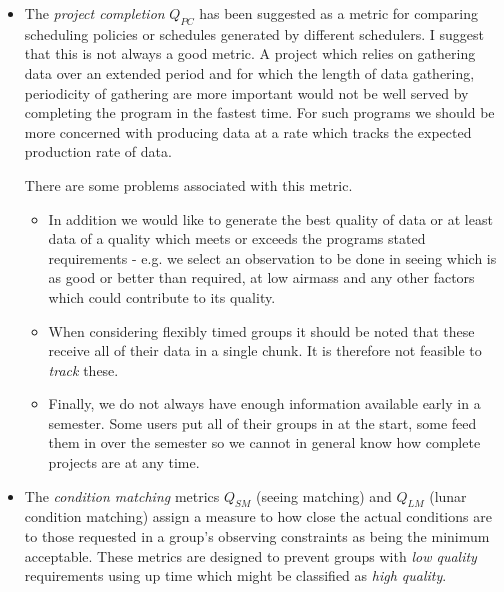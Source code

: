 \begin{itemize}
\item The \emph{project completion} $Q_{PC}$ has been suggested as a metric for comparing scheduling policies or schedules generated by different schedulers. I suggest that this is not always a good metric. A project which relies on gathering data over an extended period and for which the length of data gathering, periodicity of gathering are more important would not be well served by completing the program in the fastest time. For such programs we should be more concerned with producing data at a rate which tracks the expected production rate of data. 

There are some problems associated with this metric.
\begin{itemize}
\item In addition we would like to generate the best quality of data or at least data of a quality which meets or exceeds the programs stated requirements - e.g. we select an observation to be done in seeing which is as good or better than required, at low airmass and any other factors which could contribute to its quality. 

\item When considering flexibly timed groups it should be noted that these receive all of their data in a single chunk. It is therefore not feasible to \emph{track} these.

\item Finally, we do not always have enough information available early in a semester. Some users put all of their groups in at the start, some feed them in over the semester so we cannot in general know how complete projects are at any time.
\end{itemize}


\item The \emph{condition matching} metrics $Q_{SM}$ (seeing matching) and $Q_{LM}$ (lunar condition matching)   assign a measure to how close the actual conditions are to those requested in a group's observing constraints as being the minimum acceptable. These metrics are designed to prevent groups with \emph{low quality} requirements using up time which might be classified as \emph{high quality}. 


\end{itemize}
